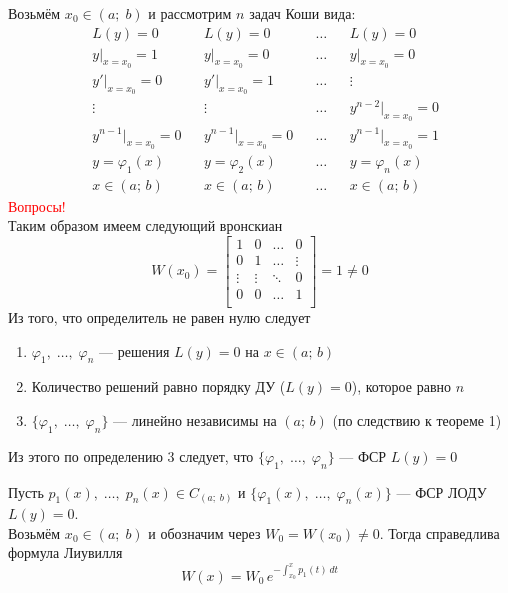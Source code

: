 \begin{Proof}
    Возьмём $x_0 \in (a;\;b)$ и рассмотрим $n$ задач Коши вида:
    \begin{align*}
        &L(y) = 0 && L(y) = 0 && \dots &&  L(y) = 0\\
        &y|_{x=x_0} = 1 && y|_{x=x_0} = 0 && \dots &&  y|_{x=x_0} = 0\\
        &y'|_{x=x_0} = 0 && y'|_{x=x_0} = 1 && \dots && \vdots \\
        &\vdots && \vdots && \dots && y^{n-2}|_{x=x_0} = 0\\
        &y^{n-1}|_{x=x_0} = 0 && y^{n-1}|_{x=x_0} = 0 && \dots && y^{n-1}|_{x=x_0} = 1\\
        & y = \varphi_1(x) && y = \varphi_2(x) && \dots && y = \varphi_n(x)\\
        & x \in(a;\,b) && x \in(a;\,b) && \dots  && x \in(a;\,b)
    \end{align*}
    \textcolor{red}{Вопросы!}\\
    Таким образом имеем следующий вронскиан
    \[
        W(x_0) = \begin{bmatrix}
            1 & 0 & \dots & 0\\
            0 & 1 & \dots & \vdots\\
            \vdots & \vdots & \ddots & 0\\
            0 & 0 & \dots & 1\\
        \end{bmatrix} = 1 \neq 0
    \]
    Из того, что определитель не равен нулю следует
    \begin{enumerate}
        \item $\varphi_1,\; \dots,\; \varphi_n$ --- решения $L(y) = 0$ на $x \in(a;\,b)$
        \item Количество решений равно порядку ДУ ($L(y) = 0$), которое равно $n$ 
        \item $\{\varphi_1,\; \dots,\; \varphi_n\}$ --- линейно независимы на $(a;\,b)$ (по следствию к теореме 1)
    \end{enumerate}
    Из этого по определению 3 следует, что $\{\varphi_1,\; \dots,\; \varphi_n\}$ --- ФСР $L(y) = 0$\\
\end{Proof}

\begin{Th}
    Пусть $p_1(x),\; \dots,\; p_n(x) \in C_{(a;\;b)}$ и $\{\varphi_1(x),\; \dots,\; \varphi_n(x)\}$ --- ФСР ЛОДУ $L(y) = 0$.\\
    
    Возьмём $x_0 \in (a;\;b)$ и обозначим через $W_0 = W(x_0) \neq 0$. Тогда справедлива формула Лиувилля
    \[
        W(x) = W_0\,e^{- \int_{x_0}^x p_1(t)\,dt}
    \]
\end{Th}


